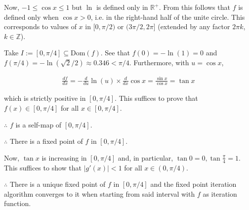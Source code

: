 \documentclass[12pt]{article}
\theoremstyle{definition}
\begin{document}
Now, $-1 \leq \cos x \leq 1$ but $\ln$ is defined only in $\mathbb{R}^+$. From
this follows that $f$ is defined only when $\cos x > 0$, i.e. in the right-hand
half of the unite circle. This corresponds to values of $x$ in $[0, \pi / 2)$ or 
$(3\pi / 2, 2\pi]$ (extended by any factor $2\pi k$, $k \in \mathbb{Z}$).

Take $I := [0, \pi /4] \subseteq \text{Dom}(f)$. See that $f(0) = -\ln(1) = 0$
and $f(\pi / 4) = -\ln(\sqrt{2} / 2 ) \approx 0.346 < \pi /4$. Furthermore, with
$u = \cos x$,

\begin{align*}
    \frac{df}{dx} = -\frac{d}{du} \ln(u) \times \frac{d}{dx} \cos x =
    \frac{\sin x}{\cos x} = \tan x
\end{align*}

which is strictly positive in $[0, \pi / 4]$. This suffices to prove that $f(x)
\in [0, \pi / 4]$ for all $x \in  [0, \pi / 4]$. 

$\therefore $ $f$ is a self-map of $[0, \pi / 4]$.

$\therefore $ There is a fixed point of $f$ in $[0, \pi / 4]$.

Now, $\tan x$ is increasing in $[0, \pi / 4]$ and, in particular, $\tan 0 = 0,
\tan \frac{\pi}{4} = 1$. This suffices to show that $|g'(x)| < 1$ for all $x \in
(0, \pi / 4)$. 

$\therefore $ There is a unique fixed point of $f$ in $[0, \pi / 4]$ and the
fixed point iteration algorithm converges to it when starting from said interval
with $f$ as iteration function.
\end{document}
